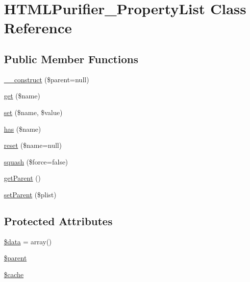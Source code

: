 \hypertarget{classHTMLPurifier__PropertyList}{\section{H\+T\+M\+L\+Purifier\+\_\+\+Property\+List Class Reference}
\label{classHTMLPurifier__PropertyList}
}
\subsection*{Public Member Functions}
\begin{DoxyCompactItemize}
\item 
\hyperlink{classHTMLPurifier__PropertyList_a5e6b4a51e31be4271142c783dbb5d659}{\+\_\+\+\_\+construct} (\$parent=null)
\item 
\hyperlink{classHTMLPurifier__PropertyList_a93f54126f629650791ff7381fa44fa86}{get} (\$name)
\item 
\hyperlink{classHTMLPurifier__PropertyList_a6fdd7bab7f4e1cc0ba45464f6def2a9b}{set} (\$name, \$value)
\item 
\hyperlink{classHTMLPurifier__PropertyList_afac8dc30919bdec5ab941688d2fdc3f0}{has} (\$name)
\item 
\hyperlink{classHTMLPurifier__PropertyList_a7a15d8142147e3337d7b359e0032dd16}{reset} (\$name=null)
\item 
\hyperlink{classHTMLPurifier__PropertyList_a9529aa9f4a400124f5fafee95b68d13e}{squash} (\$force=false)
\item 
\hyperlink{classHTMLPurifier__PropertyList_a530d076ff22d7b3b79e23b0ba982304a}{get\+Parent} ()
\item 
\hyperlink{classHTMLPurifier__PropertyList_a5ed92d7559b48b82867d3aef5d892bea}{set\+Parent} (\$plist)
\end{DoxyCompactItemize}
\subsection*{Protected Attributes}
\begin{DoxyCompactItemize}
\item 
\hyperlink{classHTMLPurifier__PropertyList_ad7a37152332e56b6d460ff5d870f0b00}{\$data} = array()
\item 
\hyperlink{classHTMLPurifier__PropertyList_a5cd68db88135d770f1df2a822d74d7dd}{\$parent}
\item 
\hyperlink{classHTMLPurifier__PropertyList_aa4ab979aa52360c136ecb515c38b5e4a}{\$cache}
\end{DoxyCompactItemize}


